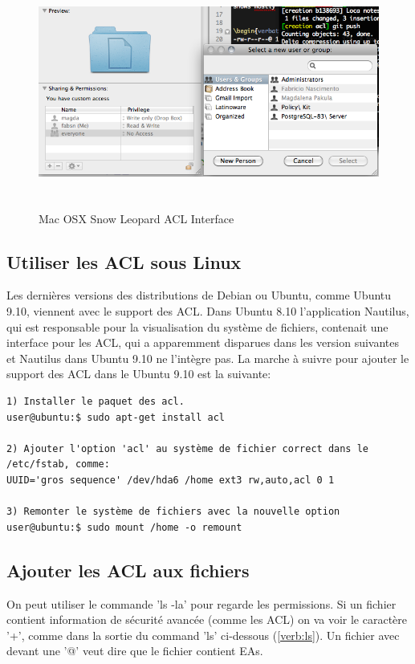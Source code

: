 \begin{figure}[htbp]
	\centering
		\includegraphics[height=3in]{img/mac-acl.png}
	\caption{Mac OSX Snow Leopard ACL Interface}
	\label{fig:img_mac-acl}
\end{figure}

\subsection*{Utiliser les ACL sous Linux}


Les dernières versions des distributions de Debian ou Ubuntu, comme Ubuntu 9.10, viennent avec le support des ACL. Dans Ubuntu 8.10 l'application Nautilus, qui est responsable pour la visualisation du système de fichiers, contenait une interface pour les ACL, qui a apparemment disparues dans les version suivantes et Nautilus dans Ubuntu 9.10 ne l'intègre pas. La marche à suivre pour ajouter le support des ACL dans le Ubuntu 9.10 est la suivante:

\begin{verbatim}
1) Installer le paquet des acl. 
user@ubuntu:$ sudo apt-get install acl

2) Ajouter l'option 'acl' au système de fichier correct dans le /etc/fstab, comme:
UUID='gros sequence' /dev/hda6 /home ext3 rw,auto,acl 0 1

3) Remonter le système de fichiers avec la nouvelle option
user@ubuntu:$ sudo mount /home -o remount

\end{verbatim}

\subsection*{Ajouter les ACL aux fichiers}

On peut utiliser le commande 'ls -la' pour regarde les permissions. Si un fichier contient information de sécurité avancée (comme les ACL) on va voir le caractère '+', comme dans la sortie du command 'ls' ci-dessous (\ref{verb:ls}). Un fichier avec devant une '@' veut dire que le fichier contient EAs. 

